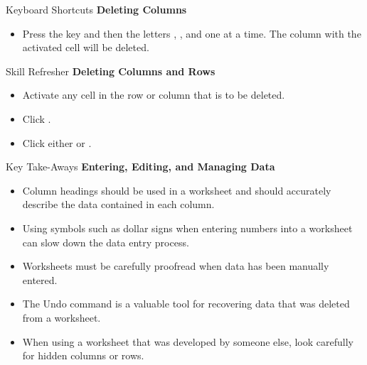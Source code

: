 \begin{center}
	\begin{shtcutbox}{Keyboard Shortcuts}
		\textbf{Deleting Columns}
		\\
		\begin{itemize}
			\setlength{\itemsep}{0pt}
			\setlength{\parskip}{0pt}
			\setlength{\parsep}{0pt}
			
			\item Press the  key and then the letters , , and  one at a time. The column with the activated cell will be deleted.
			
		\end{itemize}
	\end{shtcutbox}
\end{center}

\begin{center}
	\begin{sklbox}{Skill Refresher}
		\textbf{Deleting Columns and Rows}
		\\
		\begin{itemize}
			\setlength{\itemsep}{0pt}
			\setlength{\parskip}{0pt}
			\setlength{\parsep}{0pt}
			
			\item Activate any cell in the row or column that is to be deleted.
			\item Click .
			\item Click either  or .
			
		\end{itemize}
	\end{sklbox}
\end{center}

\begin{center}
	\begin{tkwbox}{Key Take-Aways}
		\textbf{Entering, Editing, and Managing Data}
		\\
		\begin{itemize}
			\setlength{\itemsep}{0pt}
			\setlength{\parskip}{0pt}
			\setlength{\parsep}{0pt}
			
			\item Column headings should be used in a worksheet and should accurately describe the data contained in each column.
			\item Using symbols such as dollar signs when entering numbers into a worksheet can slow down the data entry process.
			\item Worksheets must be carefully proofread when data has been manually entered.
			\item The Undo command is a valuable tool for recovering data that was deleted from a worksheet.
			\item When using a worksheet that was developed by someone else, look carefully for hidden columns or rows.
			
		\end{itemize}
	\end{tkwbox}
\end{center}

